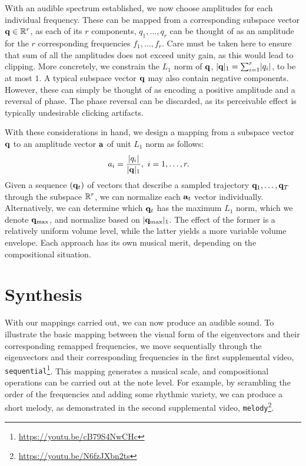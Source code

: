 \documentclass[11pt]{article}
\begin{document}
With an audible spectrum established, we now choose amplitudes for each individual frequency. These can be mapped from a corresponding subspace vector $\mathbf{q} \in \mathbb{R}^r$, as each of its $r$ components, $q_1, \ldots, q_r$ can be thought of as an amplitude for the $r$ corresponding frequencies $f_1, \ldots, f_r$. Care must be taken here to ensure that sum of all the amplitudes does not exceed unity gain, as this would lead to clipping. More concretely, we constrain the $L_1$ norm of $\mathbf{q}$, $\lvert\mathbf{q}\rvert_1 = \sum_{i=1}^{r}\lvert q_i \rvert$, to be at most $1$. A typical subspace vector $\mathbf{q}$ may also contain negative components. However, these can simply be thought of as encoding a positive amplitude and a reversal of phase. The phase reversal can be discarded, as its perceivable effect is typically undesirable clicking artifacts.

With these considerations in hand, we design a mapping from a subspace vector $\mathbf{q}$ to an amplitude vector $\mathbf{a}$ of unit $L_1$ norm as follows:
\begin{equation}
\begin{aligned}
a_i &= \frac{\lvert q_i \rvert}{\lvert\mathbf{q}\rvert_1}, \ i = 1, \ldots, r.
\end{aligned}
\end{equation}
Given a sequence $(\mathbf{q}_t)$ of vectors that describe a sampled trajectory $\mathbf{q}_1, \ldots, \mathbf{q}_T$ through the subspace $\mathbb{R}^r$, we can normalize each $\mathbf{a}_t$ vector individually. Alternatively, we can determine which $\mathbf{q}_t$ has the maximum $L_1$ norm, which we denote ${\mathbf{q}}_\textnormal{max}$, and normalize based on $\lvert\mathbf{q}_{\textnormal{max}}\rvert_1$. The effect of the former is a relatively uniform volume level, while the latter yields a more variable volume envelope. Each approach has its own musical merit, depending on the compositional situation.


\section*{Synthesis}

With our mappings carried out, we can now produce an audible sound. To illustrate the basic mapping between the visual form of the eigenvectors and their corresponding remapped frequencies, we move sequentially through the eigenvectors and their corresponding frequencies in the first supplemental video, {\tt sequential}\footnote{\url{https://youtu.be/cB79S4NwCHc}}. This mapping generates a musical scale, and compositional operations can be carried out at the note level. For example, by scrambling the order of the frequencies and adding some rhythmic variety, we can produce a short melody, as demonstrated in the second supplemental video, {\tt melody}\footnote{\url{https://youtu.be/N6fzJXbn2ts}}.
\end{document}
